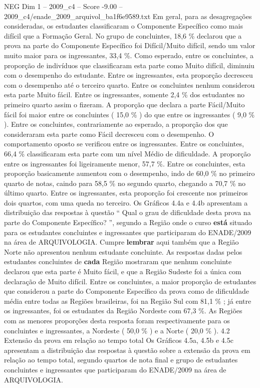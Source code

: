 \begin{textsample}{NEG Dim 1 – 2009\_c4 – Score -9.00 – 2009\_c4/enade\_2009\_arquivol\_ba1f6e9589.txt}
Em geral, para as desagregações consideradas, os estudantes classificaram o Componente Específico como mais difícil que a Formação Geral.
No grupo de concluintes, 18,6 \% declarou que a prova na parte do Componente Específico foi Difícil/Muito difícil, sendo um valor muito maior para os ingressantes, 33,4 \%.
Como esperado, entre os concluintes, a proporção de indivíduos que classificaram esta parte como Muito difícil, diminuiu com o desempenho do estudante.
Entre os ingressantes, esta proporção decresceu com o desempenho até o terceiro quarto.
Entre os concluintes nenhum considerou esta parte Muito fácil.
Entre os ingressantes, somente 2,4 \% dos estudantes no primeiro quarto assim o fizeram.
A proporção que declara a parte Fácil/Muito fácil foi maior entre os concluintes ( 15,0 \% ) do que entre os ingressantes ( 9,0 \% ).
Entre os concluintes, contrariamente ao esperado, a proporção dos que consideraram esta parte como Fácil decresceu com o desempenho.
O comportamento oposto se verificou entre os ingressantes.
Entre os concluintes, 66,4 \% classificaram esta parte com um nível Médio de dificuldade.
A proporção entre os ingressantes foi ligeiramente menor, 57,7 \%.
Entre os concluintes, esta proporção basicamente aumentou com o desempenho, indo de 60,0 \% no primeiro quarto de notas, caindo para 58,5 \% no segundo quarto, chegando a 70,7 \% no último quarto.
Entre os ingressantes, esta proporção foi crescente nos primeiros dois quartos, com uma queda no terceiro.
Os Gráficos 4.4a e 4.4b apresentam a distribuição das respostas à questão “ Qual o grau de dificuldade desta prova na parte do Componente Específico? ”, segundo a Região onde o curso \textbf{está} situado para os estudantes concluintes e ingressantes que participaram do ENADE/2009 na área de ARQUIVOLOGIA.
Cumpre \textbf{lembrar} aqui também que a Região Norte não apresentou nenhum estudante concluinte.
As respostas dadas pelos estudantes concluintes de \textbf{cada} Região mostraram que nenhum concluinte declarou que esta parte é Muito fácil, e que a Região Sudeste foi a única com declaração de Muito difícil.
Entre os concluintes, a maior proporção de estudantes que considerou a parte do Componente Específico da prova como de dificuldade média entre todas as Regiões brasileiras, foi na Região Sul com 81,1 \% ; já entre os ingressantes, foi os estudantes da Região Nordeste com 67,3 \%.
As Regiões com as menores proporções desta resposta foram respectivamente para os concluintes e ingressantes, a Nordeste ( 50,0 \% ) e a Norte ( 20,0 \% ). 4.2 Extensão da prova em relação ao tempo total Os Gráficos 4.5a, 4.5b e 4.5c apresentam a distribuição das respostas à questão sobre a extensão da prova em relação ao tempo total, segundo quartos de nota final e grupo de estudantes concluintes e ingressantes que participaram do ENADE/2009 na área de ARQUIVOLOGIA.

\end{textsample}
